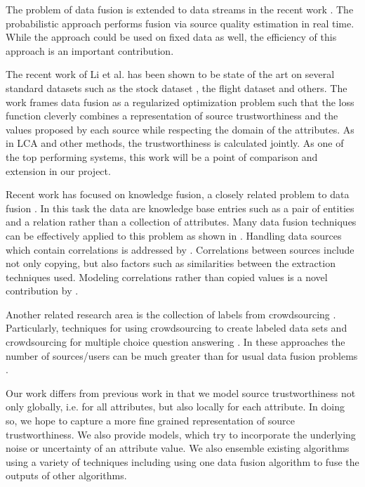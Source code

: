 \documentclass{acm_proc_article-sp}
\begin{document}
The problem of data fusion is extended to data streams in the recent work \cite{zhao:truth}. The probabilistic approach performs fusion via source quality estimation in real time. While the approach could be used on fixed data as well, the efficiency of this approach is an important contribution. 

The recent work of Li et al. \cite{li:resolving} has been shown to be state of the art on several standard datasets such as the stock dataset \cite{li:truth}, the flight dataset \cite{li:truth} and others. The work frames data fusion as a regularized optimization problem such that the loss function cleverly combines a representation of source trustworthiness and the values proposed by each source while respecting the domain of the attributes. As in LCA and other methods, the trustworthiness is calculated jointly. As one of the top performing systems, this work will be a point of comparison and extension in our project. 

Recent work has focused on knowledge fusion, a closely related problem to data fusion \cite{dong:data} \cite{pochampally:fusing} \cite{yu:wisdom}.  In this task the data are knowledge base entries such as a pair of entities and a relation rather than a collection of attributes. Many data fusion techniques can be effectively applied to this problem as shown in \cite{dong:data}. Handling data sources which contain correlations is addressed by \cite{pochampally:fusing}. Correlations between sources include not only copying, but also factors such as similarities between the extraction techniques used. Modeling correlations rather than copied values is a novel contribution by  \cite{pochampally:fusing}.


Another related research area is the collection of labels from crowdsourcing \cite{nguyen:minimizing}. Particularly, techniques for using crowdsourcing to create labeled data sets \cite{sheng:get} \cite{nguyen:minimizing} and crowdsourcing for multiple choice question answering \cite{bachrach:grade}. In these approaches the number of sources/users can be much greater than for usual data fusion problems \cite{li:truth} \cite{nguyen:minimizing}.

Our work differs from previous work in that we model source trustworthiness not only globally, i.e. for all attributes, but also locally for each attribute. In doing so, we hope to capture a more fine grained representation of source trustworthiness. We also provide models, which try to incorporate the underlying noise or uncertainty of an attribute value. We also ensemble existing algorithms using a variety of techniques including using one data fusion algorithm to fuse the outputs of other algorithms. 
\end{document}
